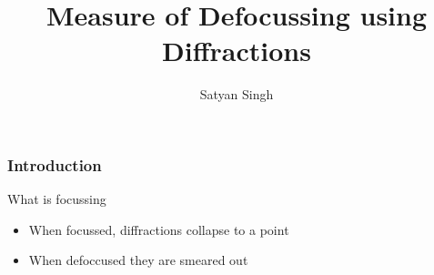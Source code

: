

\title[]{Measure of Defocussing using Diffractions}
\subtitle{}
\author[]{Satyan Singh}
\date{}
\logo{}
\Large

\def\big#1{\begin{center} \LARGE \textbf{#1} \end{center}}
\def\cen#1{\begin{center}        \textbf{#1} \end{center}}

 { \cwpcover }

\begin{frame} \frametitle{Introduction}
What is focussing

\begin{itemize}
   \item When focussed, diffractions collapse to a point
   \item When defoccused they are smeared out 
\end{itemize}

\end{frame}
\cwpnote{}

